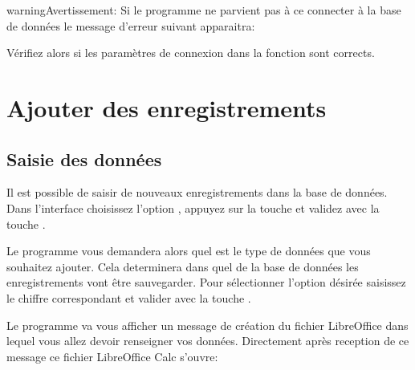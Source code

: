 \documentclass[letterpaper,10pt,french]{sphinxmanual}
\begin{document}
\begin{sphinxadmonition}{warning}{Avertissement:}
\sphinxAtStartPar
Si le programme ne parvient pas à ce connecter à la base de données le message d’erreur suivant apparaitra:

\begin{sphinxVerbatim}[commandchars=\\\{\}]
    
\end{sphinxVerbatim}

\sphinxAtStartPar
Vérifiez alors si les paramètres de connexion dans la fonction  sont corrects.
\end{sphinxadmonition}

\sphinxstepscope


\chapter{Ajouter des enregistrements}
\label{\detokenize{adddata:ajouter-des-enregistrements}}\label{\detokenize{adddata:add}}\label{\detokenize{adddata::doc}}

\section{Saisie des données}
\label{\detokenize{adddata:saisie-des-donnees}}
\sphinxAtStartPar
Il est possible de saisir de nouveaux enregistrements dans la base de données. Dans l’interface  choisissez l’option
, appuyez sur la touche  et validez avec la touche .

\sphinxAtStartPar
Le programme vous demandera alors quel est le type de données que vous souhaitez ajouter. Cela determinera dans quel  de la base
de données les enregistrements vont être sauvegarder. Pour sélectionner l’option désirée saisissez le chiffre correspondant et valider avec la touche
.

\sphinxAtStartPar
Le programme va vous afficher un message de création du fichier LibreOffice dans lequel vous allez devoir renseigner vos données. Directement après reception
de ce message ce fichier LibreOffice Calc s’ouvre:
\end{document}
